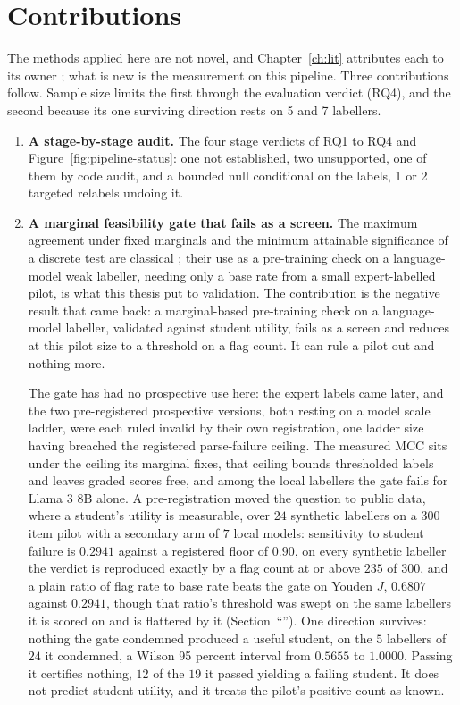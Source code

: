 \section{Contributions}
\label{sec:intro-contributions}

The methods applied here are not novel, and Chapter~\ref{ch:lit} attributes each to its owner
\citep{cohen1960kappa,feinstein1990paradoxes,cicchetti1990resolving,byrt1993pabak,kaufman2012leakage};
what is new is the measurement on this pipeline. Three contributions follow. Sample size limits the first through the evaluation
verdict (RQ4), and the second because its one surviving direction rests on 5 and 7
labellers.

\begin{enumerate}
\item \textbf{A stage-by-stage audit.} The four stage verdicts of RQ1 to RQ4 and
Figure~\ref{fig:pipeline-status}: one not established, two unsupported, one of them by code audit, and a
bounded null conditional on the labels, 1 or 2 targeted relabels undoing it.

\item \textbf{A marginal feasibility gate that fails as a screen.} The maximum agreement
under fixed marginals and the minimum attainable significance of a discrete test are classical
\citep{cohen1960kappa,tarone1990modified}; their use as a pre-training check on a
language-model weak labeller, needing only a base rate from a small expert-labelled pilot, is
what this thesis put to validation. The contribution is the negative result that came back: a
marginal-based pre-training check on a language-model labeller, validated against student
utility, fails as a screen and reduces at this pilot size to a threshold on a flag count. It
can rule a pilot out and nothing more.

The gate has had no prospective use here: the expert labels came later, and the two
pre-registered prospective versions, both resting on a model scale ladder, were each ruled
invalid by their own registration, one ladder size having breached the registered
parse-failure ceiling. The measured MCC sits under the ceiling its marginal fixes, that ceiling
bounds thresholded labels and leaves graded scores free, and among the local labellers the gate
fails for Llama 3 8B alone. A pre-registration moved the question to public data, where a
student's utility is measurable, over $24$ synthetic labellers on a $300$ item pilot with a
secondary arm of $7$ local models: sensitivity to student failure is $0.2941$ against a registered
floor of $0.90$, on every synthetic labeller the verdict is reproduced exactly by a flag count at or above $235$ of $300$,
and a plain ratio of flag rate to base rate beats the gate on Youden $J$, $0.6807$ against
$0.2941$, though that ratio's threshold was swept on the same labellers it is scored on and is
flattered by it (Section~``''). One direction survives: nothing the gate
condemned produced a useful student, on the $5$ labellers of $24$ it condemned, a Wilson 95
percent interval from $0.5655$ to $1.0000$. Passing it certifies nothing, $12$ of the $19$ it
passed yielding a failing student. It does not predict student utility, and it treats the pilot's
positive count as known.


\end{enumerate}
